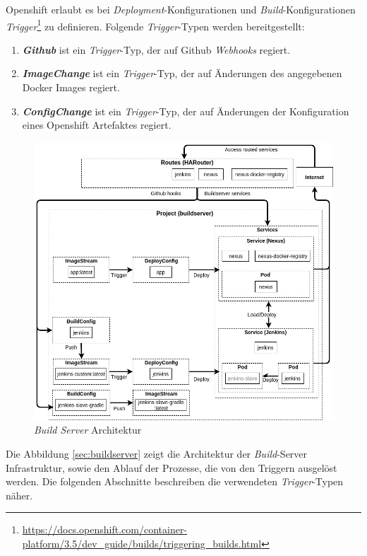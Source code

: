 Openshift erlaubt es bei \emph{Deployment}-Konfigurationen und \emph{Build}-Konfigurationen \emph{Trigger}\footnote{\url{https://docs.openshift.com/container-platform/3.5/dev_guide/builds/triggering_builds.html}} zu definieren. Folgende \emph{Trigger}-Typen werden bereitgestellt:
\begin{enumerate}
	\item\textbf{\emph{Github}} ist ein \emph{Trigger}-Typ, der auf Github \emph{Webhooks} regiert.
	\item\textbf{\emph{ImageChange}} ist ein \emph{Trigger}-Typ, der auf Änderungen des angegebenen Docker Images regiert.
	\item\textbf{\emph{ConfigChange}} ist ein \emph{Trigger}-Typ, der auf Änderungen der Konfiguration eines Openshift Artefaktes regiert.
\end{enumerate}

\begin{figure}[H]
	\centering
	\includegraphics[scale=0.5]{logos/architecture-diagram-buildserver.jpg}
	\caption{\emph{Build Server} Architektur}
	\label{fig:architecture}
\end{figure}

Die Abbildung \ref{sec:buildserver} zeigt die Architektur der \emph{Build}-Server Infrastruktur, sowie den Ablauf der Prozesse, die von den Triggern ausgelöst werden. Die folgenden Abschnitte beschreiben die verwendeten \emph{Trigger}-Typen näher.

